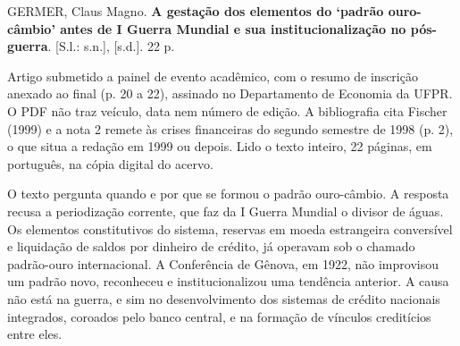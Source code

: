 
\begin{identificacao}
GERMER, Claus Magno. \textbf{A gestação dos elementos do `padrão ouro-câmbio'
antes de I Guerra Mundial e sua institucionalização no pós-guerra}. [S.l.:
s.n.], [s.d.]. 22 p.

Artigo submetido a painel de evento acadêmico, com o resumo de inscrição anexado
ao final (p. 20 a 22), assinado no Departamento de Economia da UFPR. O PDF não
traz veículo, data nem número de edição. A bibliografia cita Fischer (1999) e a
nota 2 remete às crises financeiras do segundo semestre de 1998 (p. 2), o que
situa a redação em 1999 ou depois. Lido o texto inteiro, 22 páginas, em
português, na cópia digital do acervo.
\end{identificacao}

O texto pergunta quando e por que se formou o padrão ouro-câmbio. A resposta
recusa a periodização corrente, que faz da I Guerra Mundial o divisor de águas.
Os elementos constitutivos do sistema, reservas em moeda estrangeira conversível
e liquidação de saldos por dinheiro de crédito, já operavam sob o chamado
padrão-ouro internacional. A Conferência de Gênova, em 1922, não improvisou um
padrão novo, reconheceu e institucionalizou uma tendência anterior. A causa não
está na guerra, e sim no desenvolvimento dos sistemas de crédito nacionais
integrados, coroados pelo banco central, e na formação de vínculos creditícios
entre eles.

